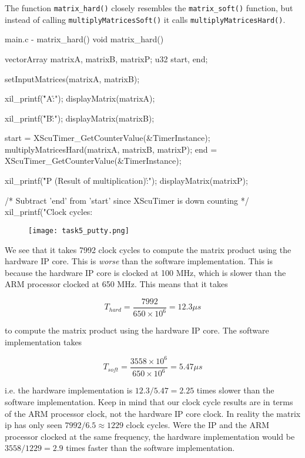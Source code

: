 \documentclass[../main.tex]{subfiles}
\begin{document}
\newpage

The function \texttt{matrix\_hard()} closely resembles the \texttt{matrix\_soft()} function, but instead of calling \texttt{multiplyMatricesSoft()} it calls \texttt{multiplyMatricesHard()}.

\begin{myminted}{main.c - matrix\_hard()}
void matrix_hard()
{
	vectorArray matrixA, matrixB, matrixP;
	u32 start, end;

	setInputMatrices(matrixA, matrixB);

	xil_printf("\r\n\nMatrix A:\r\n");
	displayMatrix(matrixA);

	xil_printf("\r\n\nMatrix B:\r\n");
	displayMatrix(matrixB);

	start = XScuTimer_GetCounterValue(&TimerInstance);
	multiplyMatricesHard(matrixA, matrixB, matrixP);
	end = XScuTimer_GetCounterValue(&TimerInstance);

	xil_printf("\r\n\nMatrix P (Result of multiplication):\r\n");
	displayMatrix(matrixP);

	/* Subtract 'end' from 'start' since XScuTimer is down counting */
	xil_printf("Clock cycles: %
}
\end{myminted}

\begin{figure}[h]
    \centering
    \texttt{[image: task5\_putty.png]}
\end{figure}

\newpage

We see that it takes 7992 clock cycles to compute the matrix product using the hardware IP core. This is \textit{worse} than the software implementation. This is because the hardware IP core is clocked at 100 MHz, which is slower than the ARM processor clocked at 650 MHz. This means that it takes

$$ T_{hard} = \frac{7992}{650 \times 10^6} = 12.3 \mu s $$

to compute the matrix product using the hardware IP core. The software implementation takes

$$ T_{soft} = \frac{3558 \times 10^6}{650 \times 10^6} = 5.47 \mu s $$

i.e. the hardware implementation is $12.3/5.47 = 2.25$ times slower than the software implementation. Keep in mind that our clock cycle results are in terms of the ARM processor clock, not the hardware IP core clock. In reality the matrix ip has only seen $7992/6.5 \approx 1229$ clock cycles. Were the IP and the ARM processor clocked at the same frequency, the hardware implementation would be $3558/1229 = 2.9$ times faster than the software implementation.
\end{document}
